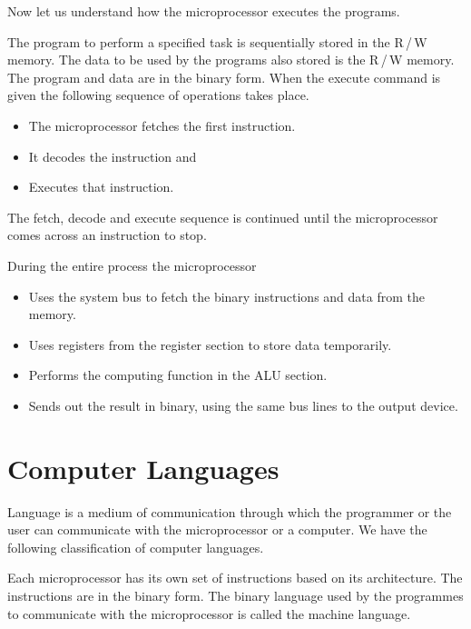Now let us understand how the microprocessor executes the programs.

The program to perform a specified task is sequentially stored in the R\,/\,W memory. The data to be used by the programs also stored is the R\,/\,W memory. The program and data are in the binary form. When the execute command is given the following sequence of operations takes place.
\begin{itemize}
\itemsep=0pt
\item The microprocessor fetches the first instruction.

\item It decodes the instruction and

\item Executes that instruction.
\end{itemize}

The fetch, decode and execute sequence is continued until the microprocessor comes across an instruction to stop.


During the entire process the microprocessor
\begin{itemize}
\itemsep=0pt
\item Uses the system bus to fetch the binary instructions and data from the memory.

\item Uses registers from the register section to store data temporarily. 

\item Performs the computing function in the ALU section.

\item Sends out the result in binary, using the same bus lines to the output device.
\end{itemize}

\section{Computer Languages}\label{sec7.6}

Language is a medium of communication through which the programmer or the user can communicate with the microprocessor or a computer. We have the following classification of computer languages.

\medskip
{}

Each microprocessor has its own set of instructions based on its architecture. The instructions are in the binary form. The binary language used by the programmes to communicate with the microprocessor is called the machine language.


